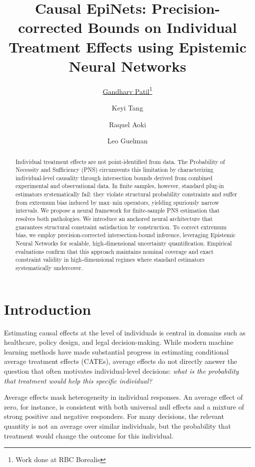 \documentclass[accepted]{uai2026} %
\title{Causal EpiNets: Precision-corrected Bounds on Individual Treatment Effects using Epistemic Neural Networks}
\author[1]{\href{mailto:<gandharv.patil@mail.mcgill.ca>?Subject=Your UAI 2026 paper}{Gandharv Patil}{}\thanks{Work done at RBC Borealis}}
\author[2]{Keyi Tang}
\author[2]{Raquel Aoki}
\author[2]{Leo Guelman}
\affil[1]{%
    McGill University/Mila
}
\affil[2]{%
    RBC Borealis
}
\theoremstyle{plain}
\theoremstyle{definition}
\theoremstyle{remark}
\begin{document}
\maketitle

\begin{abstract}
Individual treatment effects are not point-identified from data. 
The Probability of Necessity and Sufficiency (PNS) circumvents 
this limitation by characterizing individual-level causality through 
intersection bounds derived from combined experimental and observational 
data. In finite samples, however, standard plug-in estimators systematically 
fail: they violate structural probability constraints and suffer from extremum 
bias induced by max–min operators, yielding spuriously narrow intervals. 
We propose a neural framework for finite-sample PNS estimation that resolves 
both pathologies. We introduce an anchored neural architecture that guarantees 
structural constraint satisfaction by construction. To correct extremum bias, 
we employ precision-corrected intersection-bound inference, leveraging Epistemic 
Neural Networks for scalable, high-dimensional uncertainty quantification. 
Empirical evaluations confirm that this approach maintains nominal coverage 
and exact constraint validity in high-dimensional regimes where standard 
estimators systematically undercover.
\end{abstract}

\section{Introduction}
Estimating causal effects at the level of individuals is central in domains
such as healthcare, policy design, and legal decision-making.
While modern machine learning methods have made substantial progress in
estimating conditional average treatment effects (CATEs),
average effects do not directly answer the question that often motivates
individual-level decisions:
\emph{what is the probability that treatment would help this specific
individual?}

Average effects mask heterogeneity in individual responses.
An average effect of zero, for instance, is consistent with both universal
null effects and a mixture of strong positive and negative responders.
For many decisions, the relevant quantity is not an average over similar
individuals, but the probability that treatment would change the outcome
for this individual.
\end{document}

